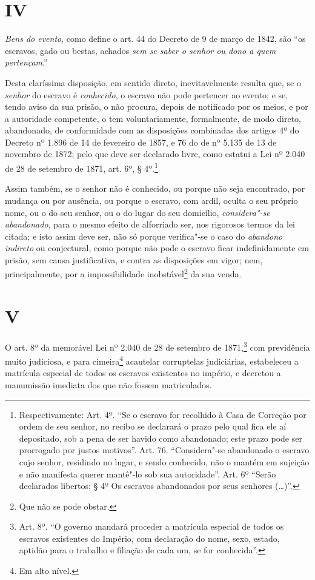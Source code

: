 \section*{IV}

\emph{Bens do evento}, como define o art. 44 do Decreto de 9 de março de
1842, são ``os escravos, gado ou bestas, achados \emph{sem se saber o
senhor ou dono a quem pertençam}.''

Desta claríssima disposição, em sentido direto, inevitavelmente resulta
que, se o \emph{senhor} do escravo é \emph{conhecido}, o escravo não
pode pertencer ao evento; e se, tendo aviso da sua prisão, o não
procura, depois de notificado por os meios, e por a autoridade
competente, o tem voluntariamente, formalmente, de modo direto,
abandonado, de conformidade com as disposições combinadas dos artigos 4º
do Decreto nº 1.896 de 14 de fevereiro de 1857, e 76 do de nº 5.135 de
13 de novembro de 1872; pelo que deve ser declarado livre, como estatui
a Lei nº 2.040 de 28 de setembro de 1871, art. 6º, § 4º.\footnote{
  Respectivamente: Art. 4º. ``Se o escravo for recolhido à Casa de
  Correção por ordem de seu senhor, no recibo se declarará o prazo pelo
  qual fica ele aí depositado, sob a pena de ser havido como abandonado;
  este prazo pode ser prorrogado por justos motivos''. Art. 76.
  ``Considera"-se abandonado o escravo cujo senhor, residindo no lugar, e
  sendo conhecido, não o mantém em sujeição e não manifesta querer
  mantê"-lo sob sua autoridade''. Art. 6º ``Serão declarados libertos: § 4º
  Os escravos abandonados por seus senhores (\ldots{})''.}

Assim também, se o senhor não é conhecido, ou porque não seja
encontrado, por mudança ou por ausência, ou porque o escravo, com ardil,
oculta o seu próprio nome, ou o do seu senhor, ou o do lugar do seu
domicílio, \emph{considera"-se abandonado}, para o mesmo efeito de
alforriado ser, nos rigorosos termos da lei citada; e isto assim deve
ser, não só porque verifica"-se o caso do \emph{abandono indireto} ou
conjectural, como porque não pode o escravo ficar indefinidamente em
prisão, sem causa justificativa, e contra as disposições em vigor; nem,
principalmente, por a impossibilidade inobstável\footnote{Que não se
  pode obstar.} da sua venda.

\section*{V}

O art. 8º da memorável Lei nº 2.040 de 28 de setembro de 1871,\footnote{
  Art. 8º. ``O governo mandará proceder a matrícula especial de todos os
  escravos existentes do Império, com declaração do nome, sexo, estado,
  aptidão para o trabalho e filiação de cada um, se for conhecida''.} com
previdência muito judiciosa, e para cimeira\footnote{Em alto nível.}
acautelar corruptelas judiciárias, estabeleceu a matrícula especial de
todos os escravos existentes no império, e decretou a manumissão
imediata dos que não fossem matriculados.

